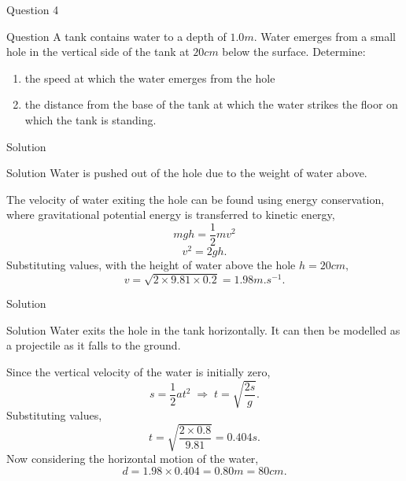 \documentclass{beamer}
\begin{document}
    \begin{frame}{Question 4}
        \begin{block}{Question}
            A tank contains water to a depth of $1.0 \si{m}$. Water emerges from a small hole in the vertical side of the tank at $20 \si{cm}$ below the surface. Determine: 
            \begin{enumerate}
                \item the speed at which the water emerges from the hole 
                \item the distance from the base of the tank at which the water strikes the floor on which the tank is standing.
            \end{enumerate}
        \end{block}
    \end{frame}

    \begin{frame}{Solution}
        \begin{exampleblock}{Solution}
            Water is pushed out of the hole due to the weight of water above.\pause
            
            The velocity of water exiting the hole can be found using energy conservation, where gravitational potential energy is transferred to kinetic energy,
            \[mgh = \frac{1}{2}mv^2\]
            \[v^2 = 2gh.\] \pause
            Substituting values, with the height of water above the hole $h = 20\si{cm},$
            \[v = \sqrt{2 \times 9.81 \times 0.2} = 1.98 \si{m.s^{-1}}.\]
        \end{exampleblock}
    \end{frame}

    \begin{frame}{Solution}
        \begin{exampleblock}{Solution}
            Water exits the hole in the tank horizontally. It can then be modelled as a projectile as it falls to the ground. \pause
            
            Since the vertical velocity of the water is initially zero,
            \[s = \frac{1}{2} at^2 \;\Rightarrow\; t = \sqrt{\frac{2s}{g}}.\]\pause
            Substituting values,
            \[t = \sqrt{\frac{2 \times 0.8}{9.81}} = 0.404 \si{s}.\]\pause
            Now considering the horizontal motion of the water,
            \[d = 1.98 \times 0.404 = 0.80 \si{m} = 80 \si{cm}.\]
        \end{exampleblock}
    \end{frame}
    
\end{document}
